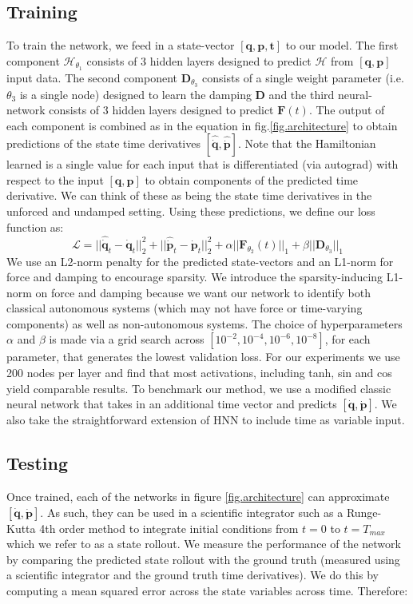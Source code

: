 \documentclass[twoside]{article}
\begin{document}
\subsection*{Training}
To train the network, we feed in a state-vector $ [\mathbf{q},\mathbf{p},\mathbf{t}]$ to our model. The first component $\mathcal{H}_{\theta_1}$ consists of 3 hidden layers designed to predict $\mathcal{H}$ from $[\mathbf{q},\mathbf{p}]$ input data. The second component $\mathbf{D}_{\theta_3}$ consists of a single weight parameter (i.e. $\theta_3$ is a single node) designed to learn the damping $\mathbf{D}$ and the third neural-network consists of 3 hidden layers designed to predict $\mathbf{F}(t)$. The output of each component is combined as in the equation in fig.\ref{fig.architecture} to obtain predictions of the state time derivatives $[\hat{\dot{\mathbf{q}}},\hat{\dot{\mathbf{p}}}]$. Note that the Hamiltonian learned is a single value for each input that is differentiated (via autograd) with respect to the input $[\mathbf{q},\mathbf{p}]$ to obtain components of the predicted time derivative. We can think of these as being the state time derivatives in the unforced and undamped setting. Using these predictions, we define our loss function as:
\begin{equation}
\mathcal{L} =|| \hat{\dot{\mathbf{q}}}_t - \mathbf{\dot{q}}_t ||_2^2 +
|| \hat{\dot{\mathbf{p}}}_t -\mathbf{\dot{p}}_t ||_2^2 + \alpha|| \mathbf{F}_{\theta_2} (t)||_1 + \beta||\mathbf{D}_{\theta_3}||_1 
\label{eqn.loss}
\end{equation}
We use an L2-norm penalty for the predicted state-vectors and an L1-norm for force and damping to encourage sparsity. We introduce the sparsity-inducing L1-norm on force and damping because we want our network to identify both classical autonomous systems (which may not have force or time-varying components) as well as non-autonomous systems. The choice of hyperparameters $\alpha$ and $\beta$ is made via a grid search across $[10^{-2},10^{-4},10^{-6},10^{-8}]$, for each parameter, that generates the lowest validation loss. For our experiments we use 200 nodes per layer and find that most activations, including tanh, sin and cos yield comparable results. To benchmark our method, we use a modified classic neural network that takes in an additional time vector and predicts $[\dot{\mathbf{q}},\dot{\mathbf{p}}]$. We also take the straightforward extension of HNN to include time as variable input. 

\subsection*{Testing}
Once trained, each of the networks in figure  \ref{fig.architecture} can approximate $[\dot{\mathbf{q}},\dot{\mathbf{p}}]$. As such, they can be used in a scientific integrator such as a Runge-Kutta 4th order method to integrate initial conditions from $t=0$ to $t=T_{max}$ which we refer to as a state rollout. We measure the performance of the network by comparing the predicted state rollout with the ground truth (measured using a scientific integrator and the ground truth time derivatives). We do this by computing a mean squared error across the state variables across time. Therefore:
\end{document}
